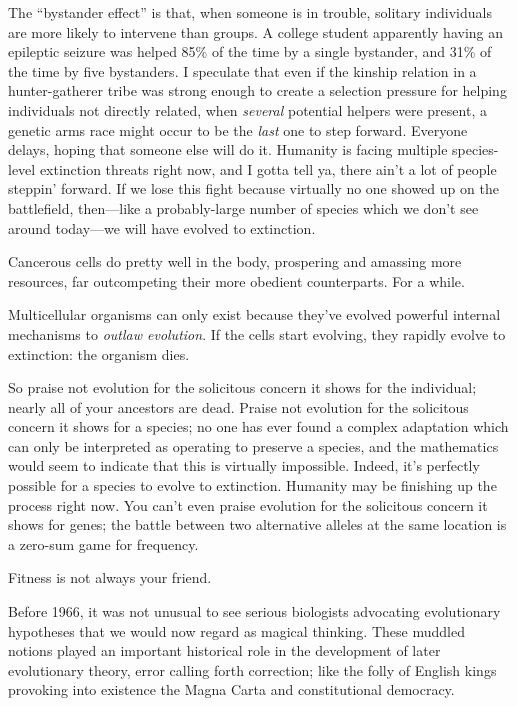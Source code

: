 {
 The ``bystander effect'' is
that, when someone is in trouble, solitary individuals are more likely
to intervene than groups. A college student apparently having an
epileptic seizure was helped 85\% of the time by a single bystander,
and 31\% of the time by five bystanders. I speculate that even if the
kinship relation in a hunter-gatherer tribe was strong enough to create
a selection pressure for helping individuals not directly related, when
\textit{several} potential helpers were present, a genetic arms race
might occur to be the \textit{last} one to step forward. Everyone
delays, hoping that someone else will do it. Humanity is facing
multiple species-level extinction threats right now, and I gotta tell
ya, there ain't a lot of people
steppin' forward. If we lose this fight because
virtually no one showed up on the battlefield, then---like a
probably-large number of species which we don't see
around today---we will have evolved to extinction.}

{
 Cancerous cells do pretty well in the body, prospering and
amassing more resources, far outcompeting their more obedient
counterparts. For a while.}

{
 Multicellular organisms can only exist because
they've evolved powerful internal mechanisms to
\textit{outlaw evolution}. If the cells start evolving, they rapidly
evolve to extinction: the organism dies.}

{
 So praise not evolution for the solicitous concern it shows for
the individual; nearly all of your ancestors are dead. Praise not
evolution for the solicitous concern it shows for a species; no one has
ever found a complex adaptation which can only be interpreted as
operating to preserve a species, and the mathematics would seem to
indicate that this is virtually impossible. Indeed,
it's perfectly possible for a species to evolve to
extinction. Humanity may be finishing up the process right now. You
can't even praise evolution for the solicitous concern
it shows for genes; the battle between two alternative alleles at the
same location is a zero-sum game for frequency.}

{
 Fitness is not always your friend.}

\myendsectiontext


{
 Before 1966, it was not unusual to see serious biologists
advocating evolutionary hypotheses that we would now regard as magical
thinking. These muddled notions played an important historical role in
the development of later evolutionary theory, error calling forth
correction; like the folly of English kings provoking into existence
the Magna Carta and constitutional democracy. }

